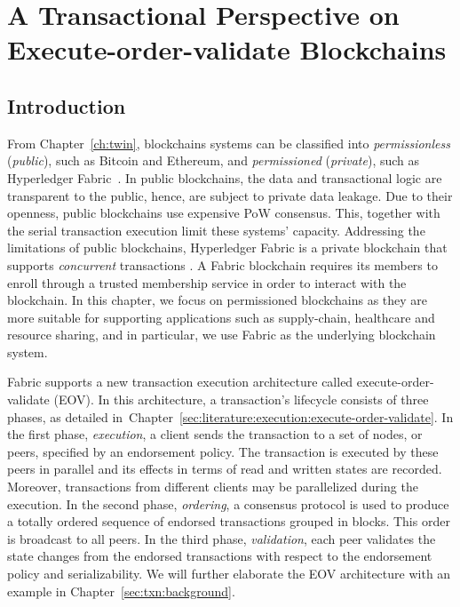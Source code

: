 \chapter{A Transactional Perspective on \\Execute-order-validate Blockchains}
\label{ch:txn}
\section{Introduction}
\label{sec:txn:intro}
From Chapter~\ref{ch:twin}, blockchains systems can be classified into \textit{permissionless}
(\textit{public}), such as Bitcoin and Ethereum, and \textit{permissioned}
(\textit{private}), such as Hyperledger Fabric~\cite{androulaki2018hyperledger}.
%
In public blockchains, the data and transactional logic are transparent to the
public, hence, are subject to private data leakage.
%
Due to their openness, public blockchains use expensive PoW consensus.
%
This, together with the serial transaction execution limit these systems' capacity.
%
Addressing the limitations of public blockchains, Hyperledger Fabric is a
private blockchain that supports \emph{concurrent} transactions
\cite{androulaki2018hyperledger}.
%
A Fabric blockchain requires its members to enroll through a trusted membership service in order to interact with the blockchain.
In this chapter, we focus on permissioned blockchains as they are more suitable
for supporting applications such as supply-chain, healthcare and resource
sharing, and in particular, we use Fabric as the underlying blockchain system.

Fabric supports a new transaction execution architecture called
execute-order-validate (EOV).
%
In this architecture, a transaction's lifecycle consists of three phases, as detailed in~Chapter~\ref{sec:literature:execution:execute-order-validate}. In the
first phase, \textit{execution}, a client sends the transaction to a set of
nodes, or peers, specified by an endorsement policy.
%
The transaction is executed by these peers in parallel and its effects in terms
of read and written states are recorded.
%
Moreover, transactions from different clients may be parallelized during the
execution.
%
In the second phase, \textit{ordering}, a consensus protocol is used
to produce a totally ordered sequence of endorsed transactions grouped in
blocks.
%
This order is broadcast to all peers. In the third phase, \textit{validation},
each peer validates the state changes from the endorsed transactions with
respect to the endorsement policy and serializability. 
%
We will further elaborate the EOV architecture with an example in Chapter~\ref{sec:txn:background}. 

